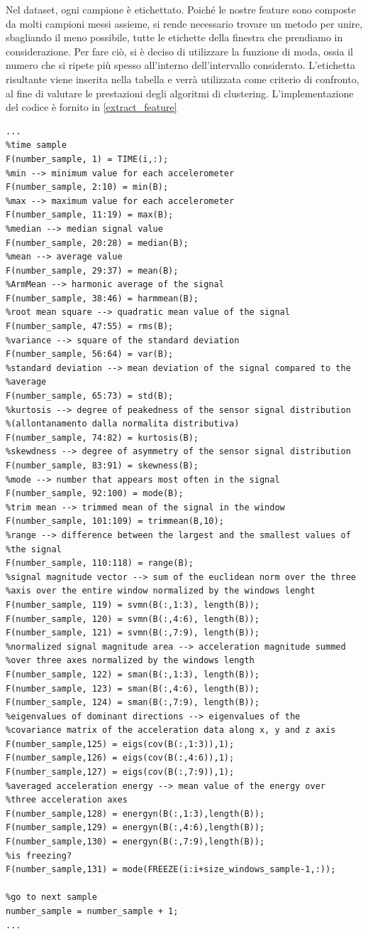 Nel dataset, ogni campione è etichettato. Poiché le nostre feature sono composte da molti campioni messi assieme, si rende necessario trovare un metodo per unire, sbagliando il meno possibile, tutte le etichette della finestra che prendiamo in considerazione. Per fare ciò, si è deciso di utilizzare la funzione di moda, ossia il numero che si ripete più spesso all'interno dell'intervallo considerato. L'etichetta risultante viene inserita nella tabella e verrà utilizzata come criterio di confronto, al fine di valutare le prestazioni degli algoritmi di clustering. L'implementazione del codice è fornito in \ref{extract_feature}
\begin{lstlisting}[style=Matlab-editor,frame=single, caption=Calcolo delle Feature, label=extract_feature]  % Start your code-block
...
%time sample
F(number_sample, 1) = TIME(i,:);
%min --> minimum value for each accelerometer
F(number_sample, 2:10) = min(B);
%max --> maximum value for each accelerometer
F(number_sample, 11:19) = max(B);
%median --> median signal value
F(number_sample, 20:28) = median(B);
%mean --> average value
F(number_sample, 29:37) = mean(B);
%ArmMean --> harmonic average of the signal
F(number_sample, 38:46) = harmmean(B);
%root mean square --> quadratic mean value of the signal
F(number_sample, 47:55) = rms(B);
%variance --> square of the standard deviation
F(number_sample, 56:64) = var(B);
%standard deviation --> mean deviation of the signal compared to the
%average
F(number_sample, 65:73) = std(B);
%kurtosis --> degree of peakedness of the sensor signal distribution
%(allontanamento dalla normalita distributiva)
F(number_sample, 74:82) = kurtosis(B);
%skewdness --> degree of asymmetry of the sensor signal distribution
F(number_sample, 83:91) = skewness(B);
%mode --> number that appears most often in the signal
F(number_sample, 92:100) = mode(B);
%trim mean --> trimmed mean of the signal in the window
F(number_sample, 101:109) = trimmean(B,10);
%range --> difference between the largest and the smallest values of
%the signal
F(number_sample, 110:118) = range(B);
%signal magnitude vector --> sum of the euclidean norm over the three
%axis over the entire window normalized by the windows lenght
F(number_sample, 119) = svmn(B(:,1:3), length(B));
F(number_sample, 120) = svmn(B(:,4:6), length(B));
F(number_sample, 121) = svmn(B(:,7:9), length(B));
%normalized signal magnitude area --> acceleration magnitude summed
%over three axes normalized by the windows length
F(number_sample, 122) = sman(B(:,1:3), length(B));
F(number_sample, 123) = sman(B(:,4:6), length(B));
F(number_sample, 124) = sman(B(:,7:9), length(B));
%eigenvalues of dominant directions --> eigenvalues of the
%covariance matrix of the acceleration data along x, y and z axis
F(number_sample,125) = eigs(cov(B(:,1:3)),1);
F(number_sample,126) = eigs(cov(B(:,4:6)),1);
F(number_sample,127) = eigs(cov(B(:,7:9)),1);
%averaged acceleration energy --> mean value of the energy over
%three acceleration axes
F(number_sample,128) = energyn(B(:,1:3),length(B));
F(number_sample,129) = energyn(B(:,4:6),length(B));
F(number_sample,130) = energyn(B(:,7:9),length(B));
%is freezing?
F(number_sample,131) = mode(FREEZE(i:i+size_windows_sample-1,:));

%go to next sample
number_sample = number_sample + 1;
...
\end{lstlisting}
